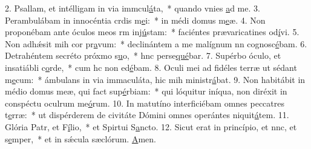 2. Psallam, et intélligam in via immcul\uline{á}ta,~* quando vnies \uline{a}d me.
3. Perambulábam in innocéntia crdis m\uline{e}i:~* in médi domus m\uline{e}æ.
4. Non proponébam ante óculos meos rm inj\uline{ú}stam:~* faciéntes prævaricatines od\uline{í}vi.
5. Non adhǽsit mih cor pr\uline{a}vum:~* declinántem a me malígnum nn cognosc\uline{é}bam.
6. Detrahéntem secréto próxmo s\uline{u}o,~* hnc perse\uline{qué}bar.
7. Supérbo óculo, et insatiábli c\uline{o}rde,~* cum hc non ed\uline{é}bam.
8. Oculi mei ad fidéles terræ ut sédant m\uline{e}cum:~* ámbulans in via immaculáta, hic mih ministr\uline{á}bat.
9. Non habitábit in médio domus meæ, qui fact sup\uline{é}rbiam:~* qui lóquitur iníqua, non diréxit in conspéctu oculrum me\uline{ó}rum.
10. In matutíno interficiébam omnes peccatres t\uline{e}rræ:~* ut dispérderem de civitáte Dómini omnes operántes niquit\uline{á}tem.
11. Glória Patr, et F\uline{í}lio,~* et Spirtui S\uline{a}ncto.
12. Sicut erat in princípio, et nnc, et s\uline{e}mper,~* et in sǽcula sæclórum. \uline{A}men.

